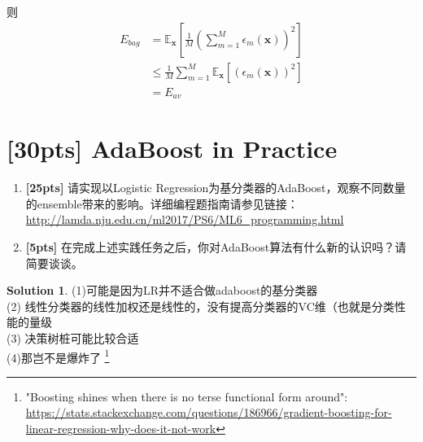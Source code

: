 \documentclass[a4paper,UTF8]{article}
\numberwithin{equation}{section}
\theoremstyle{definition}
\newtheorem*{solution}{Solution}
\begin{document}
则
\begin{equation}
\begin{split}
E_{bag} &=  \mathbb{E}_{\mathbf{x}}[\frac{1}{M}(\sum_{m=1}^M \epsilon_m(\mathbf{x}))^2]  \\
&\leq \frac{1}{M} \sum_{m=1}^M \mathbb{E}_{\mathbf{x}}[( \epsilon_m(\mathbf{x}))^2]  \\
&=   E_{av}
\end{split}
\end{equation}

\section{[30pts] AdaBoost in Practice}

\begin{enumerate}[ {(}1{)}]
\item \textbf{[25pts]} 请实现以Logistic Regression为基分类器的AdaBoost，观察不同数量的ensemble带来的影响。详细编程题指南请参见链接：
\url{http://lamda.nju.edu.cn/ml2017/PS6/ML6_programming.html}
\item \textbf{[5pts]} 在完成上述实践任务之后，你对AdaBoost算法有什么新的认识吗？请简要谈谈。
\end{enumerate}
\begin{solution}
(1)可能是因为LR并不适合做adaboost的基分类器\\
(2) 线性分类器的线性加权还是线性的，没有提高分类器的VC维（也就是分类性能的量级\\
(3) 决策树桩可能比较合适 \\
(4)那岂不是爆炸了 \footnote{"Boosting shines when there is no terse functional form around": \url{https://stats.stackexchange.com/questions/186966/gradient-boosting-for-linear-regression-why-does-it-not-work}}\\
\end{solution}
\end{document}
